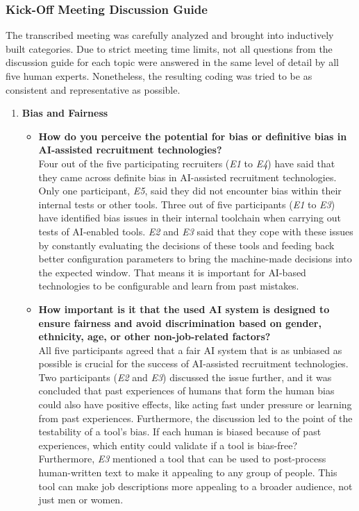 \documentclass[draft,final]{thesisclass} %
\begin{document}
\subsubsection{Kick-Off Meeting Discussion Guide} \label{kick_off_meeting_data}
The transcribed meeting was carefully analyzed and brought into inductively built categories. Due to strict meeting time limits, not all questions from the discussion guide for each topic were answered in the same level of detail by all five human experts. Nonetheless, the resulting coding was tried to be as consistent and representative as possible.
\begin{enumerate}
    \item \textbf{Bias and Fairness}
    \begin{itemize}
        \item \textbf{How do you perceive the potential for bias or definitive bias in \acs{AI}-assisted recruitment technologies?}\\
        Four out of the five participating recruiters (\textit{E1} to \textit{E4}) have said that they came across definite bias in \acs{AI}-assisted recruitment technologies. Only one participant, \textit{E5}, said they did not encounter bias within their internal tests or other tools. Three out of five participants (\textit{E1} to \textit{E3}) have identified bias issues in their internal toolchain when carrying out tests of \acs{AI}-enabled tools. \textit{E2} and \textit{E3} said that they cope with these issues by constantly evaluating the decisions of these tools and feeding back better configuration parameters to bring the machine-made decisions into the expected window. That means it is important for \acs{AI}-based technologies to be configurable and learn from past mistakes.
        \item \textbf{How important is it that the used \acs{AI} system is designed to ensure fairness and avoid discrimination based on gender, ethnicity, age, or other non-job-related factors?}\\
        All five participants agreed that a fair \acs{AI} system that is as unbiased as possible is crucial for the success of \acs{AI}-assisted recruitment technologies. Two participants (\textit{E2} and \textit{E3}) discussed the issue further, and it was concluded that past experiences of humans that form the human bias could also have positive effects, like acting fast under pressure or learning from past experiences. Furthermore, the discussion led to the point of the testability of a tool's bias. If each human is biased because of past experiences, which entity could validate if a tool is bias-free? Furthermore, \textit{E3} mentioned a tool that can be used to post-process human-written text to make it appealing to any group of people. This tool can make job descriptions more appealing to a broader audience, not just men or women.

\end{itemize}
\end{enumerate}
\end{document}
